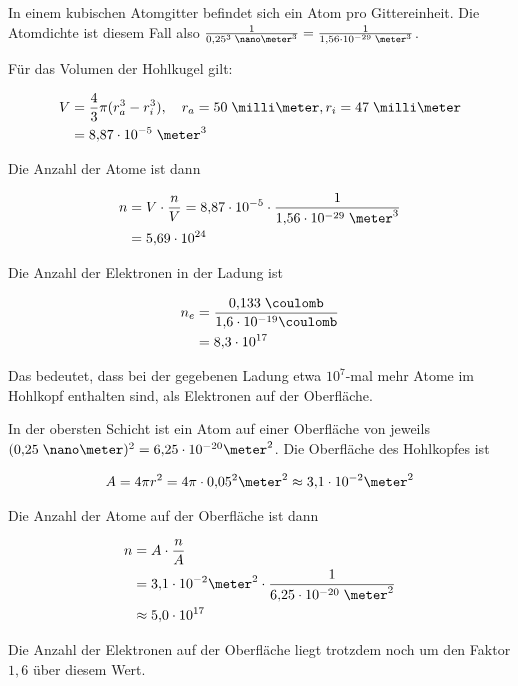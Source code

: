 \documentclass[a4paper,german,12pt,smallheadings]{scrartcl}
\begin{document}
In einem kubischen Atomgitter befindet sich ein Atom pro Gittereinheit. Die Atomdichte ist
diesem Fall also $\frac{1}{0{,}25^3 \;\nano\meter^3} = \frac{1}{1{,}56 \cdot 10^{-29} \;\meter^3}$.

Für das Volumen der Hohlkugel gilt:

\begin{align*}
  V &= \frac{4}{3} \pi (r_a^3 - r_i^3), \quad r_a = 50 \;\milli\meter, r_i = 47\;\milli\meter \\
    &= 8{,}87 \cdot 10^{-5}\; \meter^3 \\
\end{align*}

Die Anzahl der Atome ist dann

\begin{align*}
  n &= V \cdot \frac{n}{V} = 8{,}87 \cdot 10^{-5} \cdot \frac{1}{1{,}56 \cdot 10^{-29} \;\meter^3} \\
    &= 5{,}69 \cdot 10^{24}
\end{align*}

Die Anzahl der Elektronen in der Ladung ist

\begin{align*}
  n_e &= \frac{0{,}133 \;\coulomb}{1{,}6 \cdot 10^{-19} \coulomb} \\
      &= 8{,}3 \cdot 10^{17}
\end{align*}

Das bedeutet, dass bei der gegebenen Ladung etwa $10^{7}$-mal mehr Atome im
Hohlkopf enthalten sind, als Elektronen auf der Oberfläche.


In der obersten Schicht ist ein Atom auf einer Oberfläche von jeweils $(0{,}25
\;\nano\meter)^2 = 6{,}25 \cdot 10^{-20} \meter^2$. Die Oberfläche des
Hohlkopfes ist

\begin{align*}
  A = 4 \pi r^2 = 4 \pi \cdot 0{,}05^2 \meter^2 \approx 3{,}1 \cdot 10^{-2} \meter^2
\end{align*}

Die Anzahl der Atome auf der Oberfläche ist dann

\begin{align*}
  n &= A \cdot \frac{n}{A} \\
    &= 3{,}1 \cdot 10^{-2} \meter^2 \cdot \frac{1}{6{,}25 \cdot 10^{-20} \;\meter^2} \\
    &\approx 5{,}0 \cdot 10^{17}
\end{align*}

Die Anzahl der Elektronen auf der Oberfläche liegt trotzdem noch um den Faktor
$1{,}6$ über diesem Wert.
\end{document}
